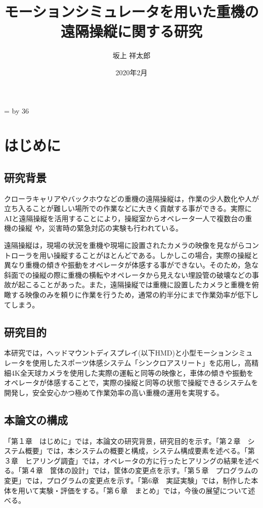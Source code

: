 \documentclass[10pt,a4paper]{jsarticle}
\title{モーションシミュレータを用いた重機の遠隔操縦に関する研究} %
\date{2020年2月} %
\author{坂上 祥太郎} %
\def\linesparpage#1{
    \baselineskip=\textheight
    \divide\baselineskip by #1
}
\begin{document}
\linesparpage{36} %

\begin{titlepage}
\maketitle
\thispagestyle{empty}
\end{titlepage}

\tableofcontents
\thispagestyle{empty}
\clearpage

\setcounter{page}{1}
\pagestyle{plain}

\section{はじめに}

\subsection{研究背景}
クローラキャリアやバックホウなどの重機の遠隔操縦は，作業の少人数化や人が立ち入ることが難しい場所での作業などに大きく貢献する事ができる。実際にAIと遠隔操縦を活用することにより，操縦室からオペレータ一人で複数台の重機の操縦 \cite{kumagai_AI}や，災害時の緊急対応の実験\cite{kumagai_mujin}も行われている。

遠隔操縦は，現場の状況を重機や現場に設置されたカメラの映像を見ながらコントローラを用い操縦することがほとんどである。しかしこの場合，実際の操縦と異なり重機の傾きや振動をオペレータが体感する事ができない。そのため，急な斜面での操縦の際に重機の横転やオペレータから見えない埋設管の破壊などの事故が起こることがあった。また，遠隔操縦では重機に設置したカメラと重機を俯瞰する映像のみを頼りに作業を行うため，通常の約半分にまで作業効率が低下してしまう。\cite{nec}


\subsection{研究目的}
本研究では，ヘッドマウントディスプレイ(以下HMD)と小型モーションシミュレータを使用したスポーツ体感システム「シンクロアスリート」を応用し，高精細4K全天球カメラを使用した実際の運転と同等の映像と，車体の傾きや振動をオペレータが体感することで，実際の操縦と同等の状態で操縦できるシステムを開発し，安全安心かつ極めて作業効率の高い重機の運用を実現する。

\subsection{本論文の構成}
「第１章　はじめに」では，本論文の研究背景，研究目的を示す。「第２章　システム概要」では，本システムの概要と構成，システム構成要素を述べる。「第３章　ヒアリング調査」では，オペレータの方に行ったヒアリングの結果を述べる。「第４章　筐体の設計」では，筐体の変更点を示す。「第５章　プログラムの変更」では，プログラムの変更点を示す。「第6章　実証実験」では，制作した本体を用いて実験・評価をする。「第６章　まとめ」では，今後の展望について述べる。
\end{document}
